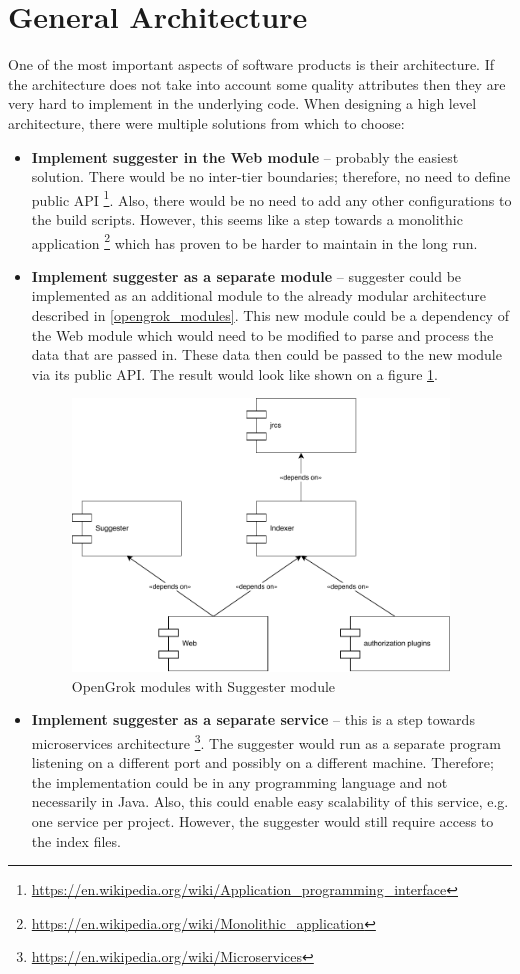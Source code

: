 \section{General Architecture}
\label{general_architecture}
One of the most important aspects of software products is their architecture. If the architecture does not take into account some
quality attributes then they are very hard to implement in the underlying code. When designing a high level architecture,
there were multiple solutions from which to choose:
\begin{itemize}
    \item \textbf{Implement suggester in the Web module} – probably the easiest solution. There would be no inter-tier
    boundaries; therefore, no need to define public API
    \footnote{\url{https://en.wikipedia.org/wiki/Application\_programming\_interface}}. Also, there would be no need
    to add any other configurations to the build scripts. However, this seems like a step towards a monolithic application
    \footnote{\url{https://en.wikipedia.org/wiki/Monolithic\_application}} which has proven to be harder to maintain in the
    long run.
    \item \textbf{Implement suggester as a separate module} – suggester could be implemented as an additional module to
    the already modular architecture described in \ref{opengrok_modules}. This new module could be a dependency of the Web
    module which would need to be modified to parse and process the data that are passed in. These data then could be
    passed to the new module via its public API. The result would look like shown on a figure \ref{opengrok_modules_changed_img}.
    \begin{figure}[htbp]
    \centering
    \includegraphics[width=100mm]{../img/opengrok_modules_changed.pdf}
    \caption{OpenGrok modules with Suggester module}
    \label{opengrok_modules_changed_img}
    \end{figure}
    \item \textbf{Implement suggester as a separate service} – this is a step towards microservices architecture
    \footnote{\url{https://en.wikipedia.org/wiki/Microservices}}. The suggester would run as a separate program
    listening on a different port and possibly on a different machine. Therefore; the implementation could be in any
    programming language and not necessarily in Java. Also, this could enable easy scalability of this service,
    e.g. one service per project. However, the suggester would still require access to the index files.
\end{itemize}

